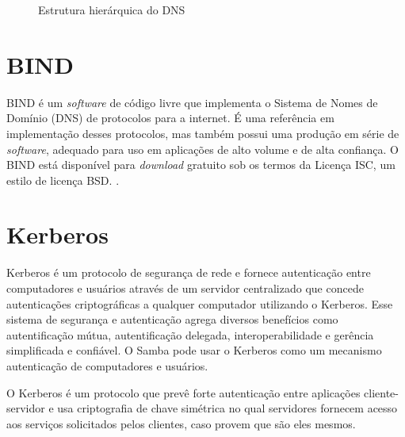\begin{figure}[ht]
   	\centering
   	\caption{Estrutura hierárquica do DNS \cite{DNS}}
    \label{dns}
\end{figure}

\section{BIND}

BIND é um \textit{software} de código livre que implementa o Sistema de Nomes de Domínio (DNS) de protocolos para a internet. É uma referência em implementação desses protocolos, mas também possui uma produção em série de \textit{software}, adequado para uso em aplicações de alto volume e de alta confiança. O BIND está disponível para \textit{download} gratuito sob os termos da Licença ISC, um estilo de licença BSD. \cite{BIND}.

\section{Kerberos}

Kerberos é um protocolo de segurança de rede e fornece autenticação entre computadores e usuários através de um servidor centralizado que concede autenticações criptográficas a qualquer computador utilizando o Kerberos. Esse sistema de segurança e autenticação agrega diversos benefícios como autentificação mútua, autentificação delegada, interoperabilidade e gerência simplificada e confiável. O Samba pode usar o Kerberos como um mecanismo autenticação de computadores e usuários.

O Kerberos é um protocolo que prevê forte autenticação entre aplicações cliente-servidor e usa criptografia de chave simétrica no qual servidores fornecem acesso aos serviços solicitados pelos clientes, caso provem que são eles mesmos. \cite{FILHO}

